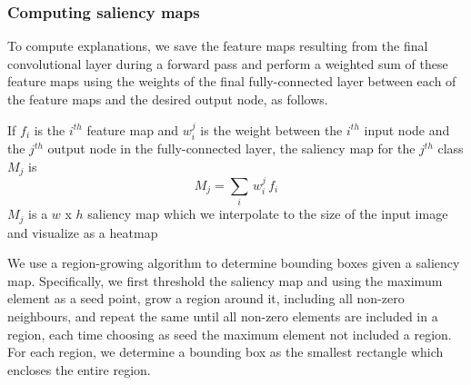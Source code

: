 \documentclass[8pt]{beamer}
\begin{document}
    \begin{frame}
      \frametitle{Computing saliency maps} To compute explanations, we save the
      feature maps resulting from the final convolutional layer during a forward
      pass and perform a weighted sum of these feature maps using the weights of
      the final fully-connected layer between
      each of the feature maps and the desired output node, as follows.\\ \pause

      \vspace{\baselineskip}

      If $f_i$ is the $i^{th}$ feature map and $w^j _i$ is the weight between
      the $i^{th}$ input node and the $j^{th}$ output node in the
      fully-connected layer, the saliency map for the $j^{th}$ class $M_j$ is
      \begin{equation}
        M_j = \sum _i \, w^j _i \, f_i
      \end{equation}
      $M_j$ is a $w$ x $h$ saliency map which we interpolate to the size of the
      input image and visualize as a heatmap
    \end{frame}

      \begin{frame}
        We use a region-growing algorithm to determine bounding boxes given a
        saliency map. Specifically, we first threshold the saliency map and
        using the maximum element as a seed point, grow a region around it,
        including all non-zero neighbours, and repeat the same until all
        non-zero elements are included in a region, each time choosing as seed
        the maximum element not included a region. For each region, we determine
        a bounding box as the smallest rectangle which encloses the entire
        region.
      \end{frame}
\end{document}
